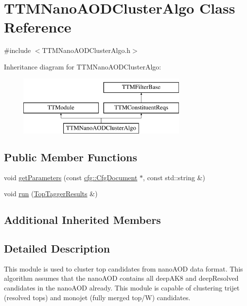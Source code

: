 \hypertarget{classTTMNanoAODClusterAlgo}{\section{T\-T\-M\-Nano\-A\-O\-D\-Cluster\-Algo Class Reference}
\label{classTTMNanoAODClusterAlgo}
}


{\ttfamily \#include $<$T\-T\-M\-Nano\-A\-O\-D\-Cluster\-Algo.\-h$>$}

Inheritance diagram for T\-T\-M\-Nano\-A\-O\-D\-Cluster\-Algo\-:\begin{figure}[H]
\begin{center}
\leavevmode
\includegraphics[height=3.000000cm]{classTTMNanoAODClusterAlgo}
\end{center}
\end{figure}
\subsection*{Public Member Functions}
\begin{DoxyCompactItemize}
\item 
void \hyperlink{classTTMNanoAODClusterAlgo_a980b0557cadd8b08953f2fc8f3b26f05}{get\-Parameters} (const \hyperlink{classcfg_1_1CfgDocument}{cfg\-::\-Cfg\-Document} $\ast$, const std\-::string \&)
\item 
void \hyperlink{classTTMNanoAODClusterAlgo_a9885e4ee2ebfe17b5ce9cb86f54830ad}{run} (\hyperlink{classTopTaggerResults}{Top\-Tagger\-Results} \&)
\end{DoxyCompactItemize}
\subsection*{Additional Inherited Members}


\subsection{Detailed Description}
This module is used to cluster top candidates from nano\-A\-O\-D data format. This algorithm assumes that the nano\-A\-O\-D contains all deep\-A\-K8 and deep\-Resolved candidates in the nano\-A\-O\-D already. This module is capable of clustering trijet (resolved tops) and monojet (fully merged top/\-W) candidates.


